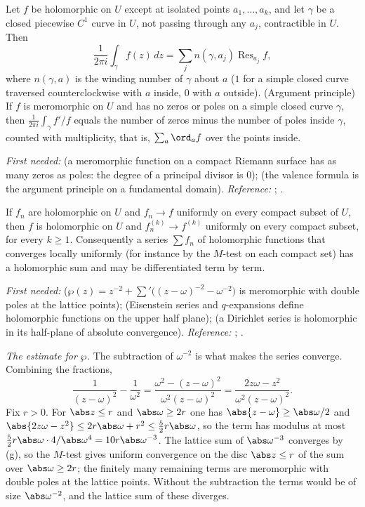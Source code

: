 \begin{theorem}\label{thm:prereq:residue}
Let $f$ be holomorphic on $U$ except at isolated points $a_1,\dots,a_k$, and let $\gamma$ be a
closed piecewise $C^1$ curve in $U$, not passing through any $a_j$, contractible in $U$. Then
\[
\frac1{2\pi i}\int_\gamma f(z)\,dz=\sum_jn(\gamma,a_j)\operatorname{Res}_{a_j}f,
\]
where $n(\gamma,a)$ is the winding number of $\gamma$ about $a$ ($1$ for a simple closed curve
traversed counterclockwise with $a$ inside, $0$ with $a$ outside). (Argument principle) If $f$ is
meromorphic on $U$ and has no zeros or poles on a simple closed curve $\gamma$, then
$\frac1{2\pi i}\int_\gamma f'/f$ equals the number of zeros minus the number of poles inside
$\gamma$, counted with multiplicity, that is, $\sum_a\ord_af$ over the points inside.
\end{theorem}
\noindent\emph{First needed:}  (a meromorphic function on a compact Riemann surface
has as many zeros as poles: the degree of a principal divisor is $0$);  (the
valence formula is the argument principle on a fundamental domain). \emph{Reference:}
\cite[Chapter 4, Section 5]{Ahlfors79}; \cite[Chapter 3]{SteinShakarchi03}.

\begin{theorem}\label{thm:prereq:weierstrass}
If $f_n$ are holomorphic on $U$ and $f_n\to f$ uniformly on every compact subset of $U$, then $f$
is holomorphic on $U$ and $f_n^{(k)}\to f^{(k)}$ uniformly on every compact subset, for every
$k\ge1$. Consequently a series $\sum f_n$ of holomorphic functions that converges locally uniformly
(for instance by the $M$-test on each compact set) has a holomorphic sum and may be differentiated
term by term.
\end{theorem}
\noindent\emph{First needed:}  ($\wp(z)=z^{-2}+\sum'\bigl((z-\omega)^{-2}-\omega^{-2}\bigr)$
is meromorphic with double poles at the lattice points);  (Eisenstein series and
$q$-expansions define holomorphic functions on the upper half plane);  (a
Dirichlet series is holomorphic in its half-plane of absolute convergence). \emph{Reference:}
\cite[Chapter 5, Section 1]{Ahlfors79}; \cite[Chapter 2]{SteinShakarchi03}.

\emph{The estimate for $\wp$.} The subtraction of $\omega^{-2}$ is what makes the series converge.
Combining the fractions,
\[
\frac1{(z-\omega)^2}-\frac1{\omega^2}=\frac{\omega^2-(z-\omega)^2}{\omega^2(z-\omega)^2}
=\frac{2z\omega-z^2}{\omega^2(z-\omega)^2}.
\]
Fix $r>0$. For $\abs z\le r$ and $\abs\omega\ge2r$ one has $\abs{z-\omega}\ge\abs\omega/2$ and
$\abs{2z\omega-z^2}\le2r\abs\omega+r^2\le\tfrac52r\abs\omega$, so the term has modulus at most
$\tfrac52r\abs\omega\cdot4/\abs\omega^4=10r\abs\omega^{-3}$. The lattice sum of $\abs\omega^{-3}$
converges by (g), so the $M$-test gives uniform convergence on the disc
$\abs z\le r$ of the sum over $\abs\omega\ge2r$; the finitely many remaining terms are meromorphic
with double poles at the lattice points. Without the subtraction the terms would be of size
$\abs\omega^{-2}$, and the lattice sum of these diverges.

